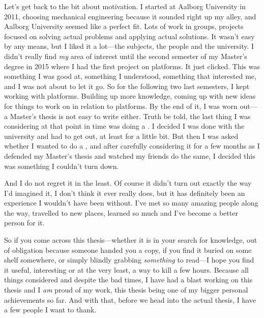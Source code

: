 Let's get back to the bit about motivation.
I started at Aalborg University in 2011, choosing mechanical engineering because it sounded right up my alley, and Aalborg University seemed like a perfect fit.
Lots of work in groups, projects focused on solving actual problems and applying actual solutions.
It wasn't easy by any means, but I liked it a lot---the subjects, the people and the university.
I didn't really find \emph{my} area of interest until the second semester of my Master's degree in 2015 where I had the first project on platforms.
It just clicked.
This was something I was good at, something I understood, something that interested me, and I was not about to let it go.
So for the following two last semesters, I kept working with platforms.
Building up more knowledge, coming up with new ideas for things to work on in relation to platforms.
By the end of it, I was worn out---a Master's thesis is not easy to write either.
Truth be told, the last thing I was considering at that point in time was doing a \PhD.
I decided I was done with the university and had to get out, at least for a little bit.
But then I was asked whether I wanted to do a \PhD, and after carefully considering it for a few months as I defended my Master's thesis and watched my friends do the same, I decided this was something I couldn't turn down.

And I do not regret it in the least.
Of course it didn't turn out exactly the way I'd imagined it, I don't think it ever really does, but it has definitely been an experience I wouldn't have been without.
I've met so many amazing people along the way, travelled to new places, learned so much and I've become a better person for it. 

So if you come across this thesis---whether it is in your search for knowledge, out of obligation because someone handed you a copy, if you find it buried on some shelf somewhere, or simply blindly grabbing \emph{something} to read---I hope you find it useful, interesting or at the very least, a way to kill a few hours.
Because all things considered and despite the bad times, I have had a blast working on this thesis and I \emph{am} proud of my work, this thesis being one of my bigger personal achievements so far.
And with that, before we head into the actual thesis, I have a few people I want to thank.


